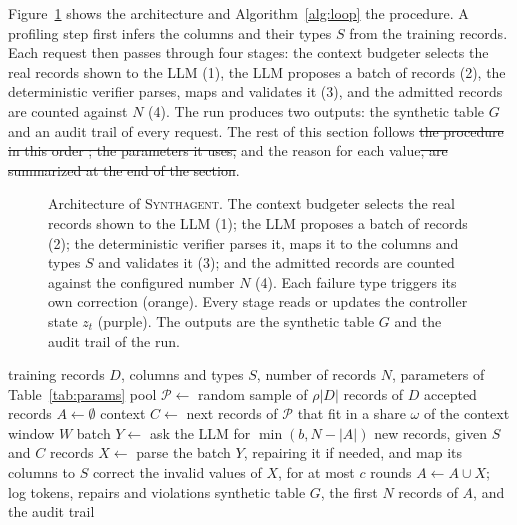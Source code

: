 \documentclass[conference]{IEEEtran}
\newcommand{\system}{\textsc{Synthagent}\xspace}
\providecommand{\DIFaddtex}[1]{{\protect\color{blue}\uwave{#1}}} %
\providecommand{\DIFdeltex}[1]{{\protect\color{red}\sout{#1}}}                      %
\providecommand{\DIFaddbegin}{} %
\providecommand{\DIFaddend}{} %
\providecommand{\DIFdelbegin}{} %
\providecommand{\DIFdelend}{} %
\providecommand{\DIFadd}[1]{\texorpdfstring{\DIFaddtex{#1}}{#1}} %
\providecommand{\DIFdel}[1]{\texorpdfstring{\DIFdeltex{#1}}{}} %
\newcommand{\DIFscaledelfig}{0.5}
\newlength{\DIFdelgraphicswidth} %
\newlength{\DIFdelgraphicsheight} %
\newcommand{\DIFaddincludegraphics}[2][]{{\color{blue}\fbox{\DIFOincludegraphics[#1]{#2}}}} %
\newcommand{\DIFdelincludegraphics}[2][]{%
\sbox{\DIFdelgraphicsbox}{\DIFOincludegraphics[#1]{#2}}%
\settoboxwidth{\DIFdelgraphicswidth}{\DIFdelgraphicsbox} %
\settoboxtotalheight{\DIFdelgraphicsheight}{\DIFdelgraphicsbox} %
\scalebox{\DIFscaledelfig}{%
\parbox[b]{\DIFdelgraphicswidth}{\usebox{\DIFdelgraphicsbox}\\[-\baselineskip] \rule{\DIFdelgraphicswidth}{0em}}\llap{\resizebox{\DIFdelgraphicswidth}{\DIFdelgraphicsheight}{%
\setlength{\unitlength}{\DIFdelgraphicswidth}%
\begin{picture}(1,1)%
\thicklines\linethickness{2pt} %
{\color[rgb]{1,0,0}\put(0,0){\framebox(1,1){}}}%
{\color[rgb]{1,0,0}\put(0,0){\line( 1,1){1}}}%
{\color[rgb]{1,0,0}\put(0,1){\line(1,-1){1}}}%
\end{picture}%
}\hspace*{3pt}}} %
} %
\DeclareRobustCommand{\DIFaddbegin}{\DIFOaddbegin \let\includegraphics\DIFaddincludegraphics} %
\DeclareRobustCommand{\DIFaddend}{\DIFOaddend \let\includegraphics\DIFOincludegraphics} %
\DeclareRobustCommand{\DIFdelbegin}{\DIFOdelbegin \let\includegraphics\DIFdelincludegraphics} %
\DeclareRobustCommand{\DIFdelend}{\DIFOaddend \let\includegraphics\DIFOincludegraphics} %
\begin{document}
Figure~\ref{fig:architecture} shows the architecture and Algorithm~\ref{alg:loop} the procedure. A profiling step first infers the columns and their types $S$ from the training records. Each request then passes through four stages: the context budgeter selects the real records shown to the LLM (1), the LLM proposes a batch of records (2), the deterministic verifier parses, maps and validates it (3), and the admitted records are counted against $N$ (4). The run produces two outputs: the synthetic table $G$ and an audit trail of every request. The rest of this section follows \DIFdelbegin \DIFdel{the procedure in this order ; the parameters it uses, }\DIFdelend \DIFaddbegin \DIFadd{this order and ends with the parameters }\DIFaddend and the reason for each value\DIFdelbegin \DIFdel{, are summarized at the end of the section}\DIFdelend .

\begin{figure}[t]
\centering
\resizebox{\textwidth}{!}{}
\caption{Architecture of \system. The context budgeter selects the real records shown to the LLM (1); the LLM proposes a batch of records (2); the deterministic verifier parses it, maps it to the columns and types $S$ and validates it (3); and the admitted records are counted against the configured number $N$ (4). Each failure type triggers its own correction (orange). Every stage reads or updates the controller state $z_t$ (purple). The outputs are the synthetic table $G$ and the audit trail of the run.}
\label{fig:architecture}
\end{figure}

\begin{algorithm}[t]
\caption{Generation procedure of \system}
\label{alg:loop}
\small
\begin{algorithmic}[1]
\Require training records $D$, columns and types $S$, number of records $N$, parameters of Table~\ref{tab:params}
\State pool $\mathcal{P}\gets$ random sample of $\rho|D|$ records of $D$
\State accepted records $A\gets\emptyset$ 
\Repeat
  \State context $C\gets$ next records of $\mathcal{P}$ that fit in a share $\omega$ of the context window $W$ 
  \State batch $Y\gets$ ask the LLM for $\min(b,N-|A|)$ new records, given $S$ and $C$ 
  \State records $X\gets$ parse the batch $Y$, repairing it if needed, and map its columns to $S$ 
  \State correct the invalid values of $X$, for at most $c$ rounds 
  \State $A\gets A\cup X$; log tokens, repairs and violations 
\State \Return synthetic table $G$, the first $N$ records of $A$, and the audit trail
\end{algorithmic}
\end{algorithm}
\end{document}
